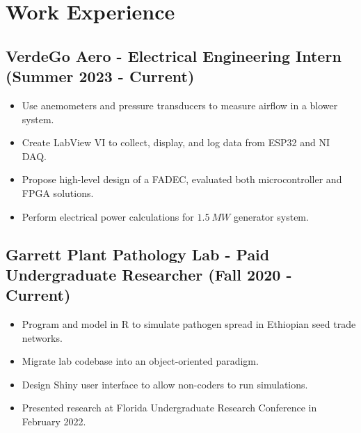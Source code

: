 \documentclass{article}
\newcommand{\sectionspacing}{\vspace{-.4em}} %
\newenvironment{CustomItemize}
{ \begin{itemize}[leftmargin=1em]
    \setlength{\itemsep}{0pt}
    \setlength{\parskip}{0pt}
    \setlength{\parindent}{0pt}
    \setlength{\parsep}{0pt}     }
{ \end{itemize}                  }
\begin{document}

\sectionspacing{}

\section{Work Experience}
\subsection{VerdeGo Aero - Electrical Engineering Intern (Summer 2023 - Current)}
\begin{CustomItemize}
\item Use anemometers and pressure transducers to measure airflow in a blower system.
\item Create LabView VI to collect, display, and log data from ESP32 and NI DAQ.
\item Propose high-level design of a FADEC, evaluated both microcontroller and FPGA solutions.
\item Perform electrical power calculations for $1.5\:MW$ generator system.
\end{CustomItemize}

\subsection{Garrett Plant Pathology Lab - Paid Undergraduate Researcher (Fall 2020 - Current)}
\begin{CustomItemize}
\item Program and model in R to simulate pathogen spread in Ethiopian seed trade networks.
\item Migrate lab codebase into an object-oriented paradigm.
\item Design Shiny user interface to allow non-coders to run simulations.
\item Presented research at Florida Undergraduate Research Conference in February 2022.
\end{CustomItemize}
\end{document}
